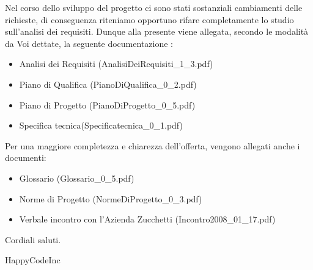 \documentclass[11pt,titlepage,a4paper]{report}
\begin{document}
Nel corso dello sviluppo del progetto ci sono stati sostanziali cambiamenti delle richieste, di conseguenza riteniamo opportuno rifare completamente lo studio sull'analisi dei requisiti. Dunque alla presente viene allegata, secondo le modalit\`a da Voi dettate, la seguente documentazione :
\begin{itemize}
\item{}Analisi dei Requisiti (AnalisiDeiRequisiti\_1\_3.pdf)
\item{}Piano di Qualifica (PianoDiQualifica\_0\_2.pdf)
\item{}Piano di Progetto (PianoDiProgetto\_0\_5.pdf)
\item{}Specifica tecnica(Specificatecnica\_0\_1.pdf) 
\end{itemize}
Per una maggiore completezza e chiarezza dell'offerta, vengono allegati
anche i documenti:
\begin{itemize}
\item{}Glossario (Glossario\_0\_5.pdf)
\item{}Norme di Progetto (NormeDiProgetto\_0\_3.pdf)
\item{}Verbale incontro con l'Azienda Zucchetti (Incontro2008\_01\_17.pdf)
\end{itemize}
Cordiali saluti.
\begin{flushright}
HappyCodeInc
\end{flushright}
\end{document}
